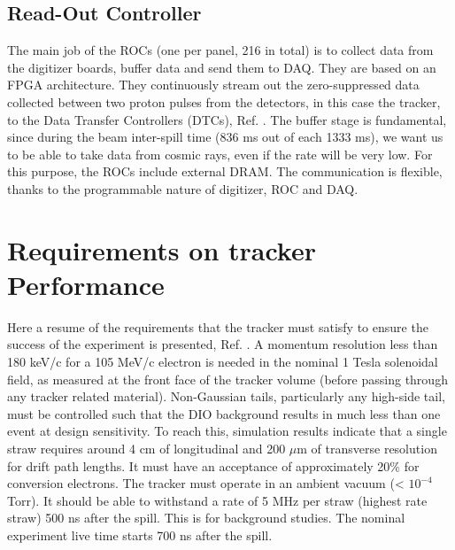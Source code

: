 \subsection{Read-Out Controller}\label{ROC} 
The main job of the ROCs (one per panel, 216 in total) 
is to collect data from the digitizer boards, buffer data and 
send them to DAQ. They are based on an FPGA architecture. They 
continuously stream out the zero-suppressed data collected between 
two proton pulses from the detectors, in this case the tracker, to 
the Data Transfer Controllers (DTCs), Ref. \cite{GIOIOSA2023167732}. The buffer 
stage is fundamental, since during the beam inter-spill time (836 ms 
out of each 1333 ms), we want us to be able to take data from cosmic 
rays, even if the rate will be very low. For this purpose, the ROCs 
include external DRAM. The communication is flexible, thanks to the 
programmable nature of digitizer, ROC and DAQ. 
\section{Requirements on tracker Performance}
Here a resume of the requirements that the tracker must satisfy to ensure the success of the experiment is presented, Ref. \cite{trkreq}.
A momentum resolution less than 180 keV/c for a 105 MeV/c electron is needed in the nominal
1 Tesla solenoidal field, as measured at the front face of the tracker volume (before
passing through any tracker related material). Non-Gaussian tails, particularly any
high-side tail, must be controlled such that the DIO background results in much less
than one event at design sensitivity. To reach this, simulation results indicate that 
a single straw requires around 4 cm of longitudinal and 200 $\mu$m of transverse resolution for drift path lengths. 
It must have an acceptance of approximately 20\% for conversion electrons.
The tracker must operate in an ambient vacuum (< $10^{-4}$ Torr).
It should be able to withstand a rate of 5 MHz per straw (highest rate straw) 500 ns after the spill. This is
for background studies. The nominal experiment live time starts 700 ns after the spill.
